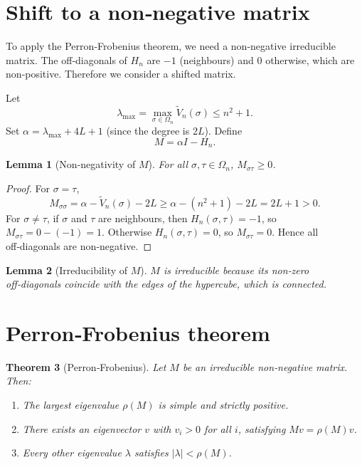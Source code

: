 \documentclass[11pt,a4paper]{article}
\newtheorem{theorem}{Theorem}[section]
\newtheorem{lemma}[theorem]{Lemma}
\begin{document}
\section{Shift to a non‑negative matrix}

To apply the Perron‑Frobenius theorem, we need a non‑negative irreducible matrix. The off‑diagonals of \(H_n\) are \(-1\) (neighbours) and \(0\) otherwise, which are non‑positive. Therefore we consider a shifted matrix.

Let
\[
\lambda_{\max} = \max_{\sigma\in\Omega_n} \tilde{V}_n(\sigma) \le n^2 + 1.
\]
Set \(\alpha = \lambda_{\max} + 4L + 1\) (since the degree is \(2L\)). Define
\[
M = \alpha I - H_n.
\]

\begin{lemma}[Non‑negativity of \(M\)]
For all \(\sigma,\tau\in\Omega_n\), \(M_{\sigma\tau} \ge 0\).
\end{lemma}
\begin{proof}
For \(\sigma=\tau\),
\[
M_{\sigma\sigma} = \alpha - \tilde{V}_n(\sigma) - 2L \ge \alpha - (n^2+1) - 2L = 2L+1 > 0.
\]
For \(\sigma\neq\tau\), if \(\sigma\) and \(\tau\) are neighbours, then \(H_n(\sigma,\tau) = -1\), so \(M_{\sigma\tau}=0 - (-1)=1\). Otherwise \(H_n(\sigma,\tau)=0\), so \(M_{\sigma\tau}=0\). Hence all off‑diagonals are non‑negative.
\end{proof}

\begin{lemma}[Irreducibility of \(M\)]
\(M\) is irreducible because its non‑zero off‑diagonals coincide with the edges of the hypercube, which is connected.
\end{lemma}

\section{Perron‑Frobenius theorem}

\begin{theorem}[Perron‑Frobenius]
Let \(M\) be an irreducible non‑negative matrix. Then:
\begin{enumerate}
\item The largest eigenvalue \(\rho(M)\) is simple and strictly positive.
\item There exists an eigenvector \(v\) with \(v_i > 0\) for all \(i\), satisfying \(Mv = \rho(M)v\).
\item Every other eigenvalue \(\lambda\) satisfies \(|\lambda| < \rho(M)\).
\end{enumerate}
\end{theorem}
\end{document}

